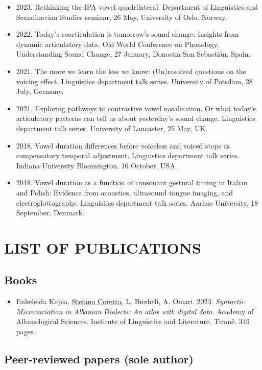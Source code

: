 \documentclass{article}
\begin{document}
\begin{itemize}
\item 2023. Rethinking the IPA vowel quadrilateral. Department of Linguistics and Scandinavian Studies seminar, 26 May, University of Oslo, Norway.
\item 2022. Today’s coarticulation is tomorrow’s sound change: Insights from dynamic articulatory data. Old World Conference on Phonology, Understanding Sound Change, 27 January, Donostia-San Sebastián, Spain.
\item 2021. The more we learn the less we know: (Un)resolved questions on the voicing effect. Linguistics department talk series. University of Potsdam, 28 July, Germany.
\item 2021. Exploring pathways to contrastive vowel nasalisation. Or what today’s articulatory patterns can tell us about yesterday’s sound change. Linguistics department talk series. University of Lancaster, 25 May, UK.
\item 2018. Vowel duration differences before voiceless and voiced stops as compensatory temporal adjustment. Linguistics department talk series. Indiana University Bloomington, 16 October, USA.
\item 2018. Vowel duration as a function of consonant gestural timing in Italian and Polish: Evidence from acoustics, ultrasound tongue imaging, and electroglottography. Linguistics department talk series. Aarhus University, 18 September, Denmark.
\end{itemize}

\section{LIST OF PUBLICATIONS}

\subsection{Books}

\begin{itemize}
	\item Enkeleida Kapia, \underline{Stefano Coretta}, L. Buxheli, A. Omari. 2023. \textit{Syntactic Microvariation in Albanian Dialects: An atlas with digital data.} Academy of Albanological Sciences. Institute of Linguistics and Literature. Tiranë. 349 pages.
\end{itemize}

\subsection{Peer-reviewed papers (sole author)}
\end{document}
